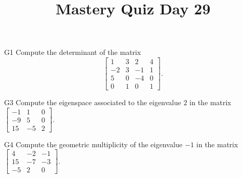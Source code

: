 \documentclass{sbgLAquiz}
\title{Mastery Quiz Day 29 }
\begin{document}
\begin{problem}{G1}
Compute the determinant of the matrix
\[
  \begin{bmatrix}
    1 & 3 & 2 & 4 \\
    -2 & 3 & -1 & 1 \\
    5 & 0 & -4 & 0 \\
    0 & 1 & 0 & 1
  \end{bmatrix}
.\]
\end{problem}

\begin{problem}{G3}
Compute the eigenspace associated to the eigenvalue $2$ in the matrix $\begin{bmatrix} -1 & 1 & 0 \\ -9 & 5 & 0 \\ 15 & -5 & 2 \end{bmatrix}$.
\end{problem}
\newpage

\begin{problem}{G4}
Compute the geometric multiplicity of the eigenvalue $-1$ in the matrix $\begin{bmatrix} 4 & -2 & -1 \\ 15 & -7 & -3 \\ -5 & 2 & 0 \end{bmatrix}$.  
\end{problem}
\end{document}
